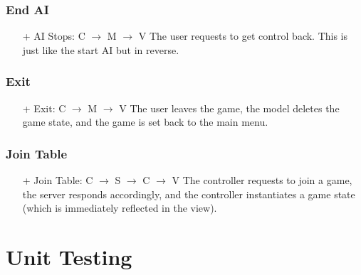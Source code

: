 \documentclass[12pt]{article}
\begin{document}
\section{End AI}

\begin{itemize}
\item[+] AI Stops: C $\rightarrow$ M $\rightarrow$ V \newline
The user requests to get control back.  This is just like the start AI but in reverse.
\end{itemize}

\section{Exit}
\begin{itemize}


\item[+] Exit: C $\rightarrow$ M $\rightarrow$ V \newline
The user leaves the game, the model deletes the game state, and the game is set back
to the main menu.

\end{itemize}
\section{Join Table}
\begin{itemize}
\item[+] Join Table: C $\rightarrow$ S $\rightarrow$ C $\rightarrow$ V \newline
The controller requests to join a game, the server responds accordingly, and the
controller instantiates a game state (which is immediately reflected in the view).
\end{itemize}

\part{Unit Testing}
\setcounter{section}{0}
\end{document}
